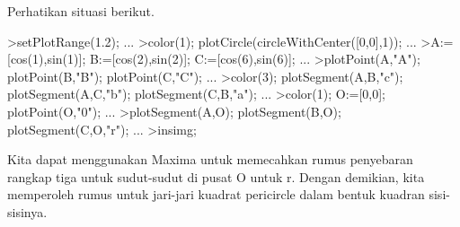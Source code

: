 \documentclass[a4paper,10pt]{article}
\begin{document}
\begin{eulernotebook}
\begin{eulercomment}
\begin{eulercomment}
\begin{eulercomment}
\begin{eulercomment}
\begin{eulercomment}
\begin{eulercomment}
\begin{eulercomment}
\begin{eulercomment}
\begin{eulercomment}
\begin{eulercomment}
\begin{eulercomment}
\begin{eulercomment}
\begin{eulercomment}
\begin{eulercomment}
\begin{eulercomment}
\begin{eulercomment}
\begin{eulercomment}
\begin{eulercomment}
\begin{eulercomment}
\begin{eulercomment}
\begin{eulercomment}
\begin{eulercomment}
\begin{eulercomment}
\begin{eulercomment}
\begin{eulercomment}
\begin{eulercomment}
\begin{eulercomment}
\begin{eulercomment}
\begin{eulercomment}
\begin{eulercomment}
\begin{eulercomment}
\begin{eulercomment}
\begin{eulercomment}
\begin{eulercomment}
\begin{eulercomment}
\begin{eulercomment}
\begin{eulercomment}
\begin{eulercomment}
\begin{eulercomment}
\begin{eulercomment}
\begin{eulercomment}
Perhatikan situasi berikut.
\end{eulercomment}
\begin{eulerprompt}
>setPlotRange(1.2); ...
>color(1); plotCircle(circleWithCenter([0,0],1)); ...
>A:=[cos(1),sin(1)]; B:=[cos(2),sin(2)]; C:=[cos(6),sin(6)]; ...
>plotPoint(A,"A"); plotPoint(B,"B"); plotPoint(C,"C"); ...
>color(3); plotSegment(A,B,"c"); plotSegment(A,C,"b"); plotSegment(C,B,"a"); ...
>color(1); O:=[0,0];  plotPoint(O,"0"); ...
>plotSegment(A,O); plotSegment(B,O); plotSegment(C,O,"r"); ...
>insimg;
\end{eulerprompt}
\begin{eulercomment}
Kita dapat menggunakan Maxima untuk memecahkan rumus penyebaran
rangkap tiga untuk sudut-sudut di pusat O untuk r. Dengan demikian,
kita memperoleh rumus untuk jari-jari kuadrat pericircle dalam bentuk
kuadran sisi-sisinya.


\end{eulercomment}
\end{eulercomment}
\end{eulercomment}
\end{eulercomment}
\end{eulercomment}
\end{eulercomment}
\end{eulercomment}
\end{eulercomment}
\end{eulercomment}
\end{eulercomment}
\end{eulercomment}
\end{eulercomment}
\end{eulercomment}
\end{eulercomment}
\end{eulercomment}
\end{eulercomment}
\end{eulercomment}
\end{eulercomment}
\end{eulercomment}
\end{eulercomment}
\end{eulercomment}
\end{eulercomment}
\end{eulercomment}
\end{eulercomment}
\end{eulercomment}
\end{eulercomment}
\end{eulercomment}
\end{eulercomment}
\end{eulercomment}
\end{eulercomment}
\end{eulercomment}
\end{eulercomment}
\end{eulercomment}
\end{eulercomment}
\end{eulercomment}
\end{eulercomment}
\end{eulercomment}
\end{eulercomment}
\end{eulercomment}
\end{eulercomment}
\end{eulercomment}
\end{eulernotebook}
\end{document}
